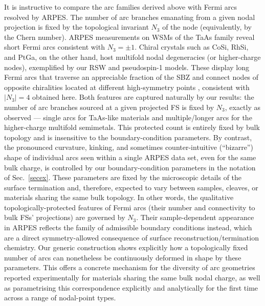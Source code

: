 \documentclass[aps,prb,onecolumn, footinbib, 10pt]{revtex4-2}
\begin{document}
It is instructive to compare the arc families derived above with Fermi arcs resolved by ARPES. The number of arc branches emanating from a given nodal projection is fixed by the topological invariant $N_3$ of the node (equivalently, by the Chern number). ARPES measurements on WSMs of the TaAs family reveal short Fermi arcs consistent with $N_3=\pm1$. Chiral crystals such as CoSi, RhSi, and PtGa, on the other hand, host multifold nodal degeneracies (or higher-charge nodes), exemplified by our RSW and pseudospin-1 models. These display long Fermi arcs that traverse an appreciable fraction of the SBZ and connect nodes of opposite chiralities located at different high-symmetry points \cite{takane2019_observation,multifold-rhsi,mengyu}, consistent with $|N_3|=4$ obtained here. Both features are captured naturally by our results: the number of arc branches sourced at a given projected FS is fixed by $N_3$, exactly as observed --- single arcs for TaAs-like materials and multiple/longer arcs for the higher-charge multifold semimetals. This protected count is entirely fixed by bulk topology and is insensitive to the boundary-condition parameters. By contrast, the pronounced curvature, kinking, and sometimes counter-intuitive (``bizarre'') shape of individual arcs seen within a single ARPES data set, even for the same bulk charge, is controlled by our boundary-condition parameters in the notation of Sec.~\ref{secex}. These parameters are fixed by the microscopic details of the surface termination and, therefore, expected to vary between samples, cleaves, or materials sharing the same bulk topology. In other words, the qualitative topologically-protected features of Fermi arcs (their number and connectivity to bulk FSs' projections) are governed by $N_3$. Their sample-dependent appearance in ARPES reflects the family of admissible boundary conditions instead, which are a direct symmetry-allowed consequence of surface reconstruction/termination chemistry. Our generic construction shows explicitly how a topologically fixed number of arcs can nonetheless be continuously deformed in shape by these parameters. This offers a concrete mechanism for the diversity of arc geometries reported experimentally for materials sharing the same bulk nodal charge, as well as parametrising this correspondence explicitly and analytically for the first time across a range of nodal-point types.
\end{document}
